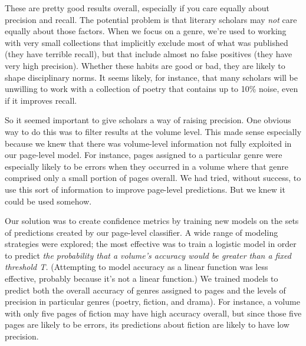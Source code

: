 \documentclass[paper=a4, fontsize=12pt]{scrartcl}
\numberwithin{equation}{section}		%
\numberwithin{figure}{section}			%
\numberwithin{table}{section}				%
\begin{document}
These are pretty good results overall, especially if you care equally about precision and recall. The potential problem is that literary scholars may \textit{not} care equally about those factors. When we focus on a genre, we're used to working with very small collections that implicitly exclude most of what was published (they have terrible recall), but that include almost no false positives (they have very high precision). Whether these habits are good or bad, they are likely to shape disciplinary norms. It seems likely, for instance, that many scholars will be unwilling to work with a collection of poetry that contains up to 10\% noise, even if it improves recall.

So it seemed important to give scholars a way of raising precision. One obvious way to do this was to filter results at the volume level. This made sense especially because we knew that there was volume-level information not fully exploited in our page-level model. For instance, pages assigned to a particular genre were especially likely to be errors when they occurred in a volume where that genre comprised only a small portion of pages overall. We had tried, without success, to use this sort of information to improve page-level predictions. But we knew it could be used somehow.

Our solution was to create confidence metrics by training new models on the sets of predictions created by our page-level classifier. A wide range of modeling strategies were explored; the most effective was to train a logistic model in order to predict \textit{the probability that a volume's accuracy would be greater than a fixed threshold T.} (Attempting to model accuracy as a linear function was less effective, probably because it's not a linear function.) We trained models to predict both the overall accuracy of genres assigned to pages and the levels of precision in particular genres (poetry, fiction, and drama). For instance, a volume with only five pages of fiction may have high accuracy overall, but since those five pages are likely to be errors, its predictions about fiction are likely to have low precision.
\end{document}
